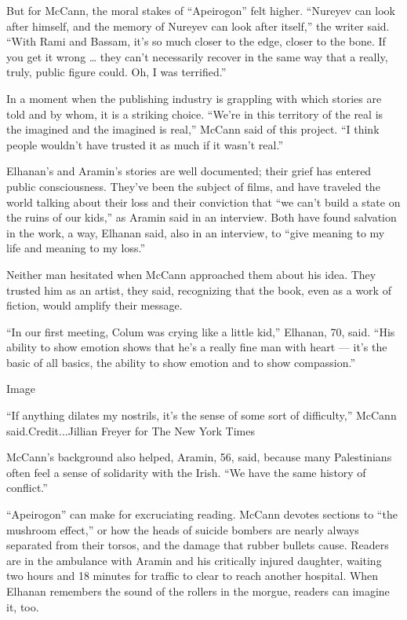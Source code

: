But for McCann, the moral stakes of ``Apeirogon'' felt higher. ``Nureyev
can look after himself, and the memory of Nureyev can look after
itself,'' the writer said. ``With Rami and Bassam, it's so much closer
to the edge, closer to the bone. If you get it wrong \ldots{} they can't
necessarily recover in the same way that a really, truly, public figure
could. Oh, I was terrified.''

In a moment when the publishing industry is grappling with which stories
are told and by whom, it is a striking choice. ``We're in this territory
of the real is the imagined and the imagined is real,'' McCann said of
this project. ``I think people wouldn't have trusted it as much if it
wasn't real.''

Elhanan's and Aramin's stories are well documented; their grief has
entered public consciousness. They've been the subject of films, and
have traveled the world talking about their loss and their conviction
that ``we can't build a state on the ruins of our kids,'' as Aramin said
in an interview. Both have found salvation in the work, a way, Elhanan
said, also in an interview, to ``give meaning to my life and meaning to
my loss.''

Neither man hesitated when McCann approached them about his idea. They
trusted him as an artist, they said, recognizing that the book, even as
a work of fiction, would amplify their message.

``In our first meeting, Colum was crying like a little kid,'' Elhanan,
70, said. ``His ability to show emotion shows that he's a really fine
man with heart --- it's the basic of all basics, the ability to show
emotion and to show compassion.''

Image

``If anything dilates my nostrils, it's the sense of some sort of
difficulty,'' McCann said.Credit...Jillian Freyer for The New York Times

McCann's background also helped, Aramin, 56, said, because many
Palestinians often feel a sense of solidarity with the Irish. ``We have
the same history of conflict.''

``Apeirogon'' can make for excruciating reading. McCann devotes sections
to ``the mushroom effect,'' or how the heads of suicide bombers are
nearly always separated from their torsos, and the damage that rubber
bullets cause. Readers are in the ambulance with Aramin and his
critically injured daughter, waiting two hours and 18 minutes for
traffic to clear to reach another hospital. When Elhanan remembers the
sound of the rollers in the morgue, readers can imagine it, too.

